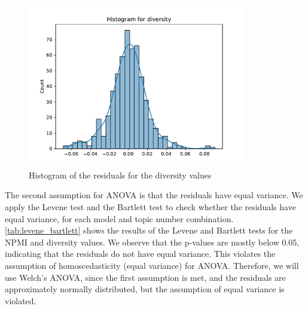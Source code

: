 \begin{figure}[h]
    \centering
    \includegraphics[width=0.85\textwidth]{figures/histogram_diversity.pdf}
    \caption{Histogram of the residuals for the diversity values}
    \label{fig:histogram_diversity}
\end{figure}

The second assumption for ANOVA is that the residuals have equal variance. We apply the Levene test and the Bartlett test to check whether the residuals have equal variance, for each model and topic number combination. \cref{tab:levene_bartlett} shows the results of the Levene and Bartlett tests for the NPMI and diversity values. We observe that the p-values are mostly below 0.05, indicating that the residuals do not have equal variance. This violates the assumption of homoscedasticity (equal variance) for ANOVA. Therefore, we will use Welch's ANOVA, since the first assumption is met, and the residuals are approximately normally distributed, but the assumption of equal variance is violated.

